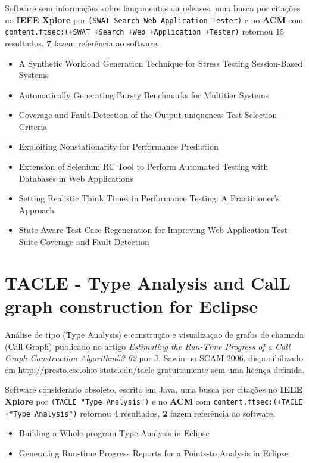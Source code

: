 Software sem informações sobre lançamentos ou releases,
uma busca por citações no {\bf IEEE Xplore} por
\texttt{(SWAT Search Web Application Tester)}
e no {\bf ACM} com
\texttt{content.ftsec:(+SWAT +Search +Web +Application +Tester)}
retornou
15 resultados,
{\bf 7} fazem referência ao software.

\begin{itemize}
\item A Synthetic Workload Generation Technique for Stress Testing Session-Based Systems
\item Automatically Generating Bursty Benchmarks for Multitier Systems
\item Coverage and Fault Detection of the Output-uniqueness Test Selection Criteria
\item Exploiting Nonstationarity for Performance Prediction
\item Extension of Selenium RC Tool to Perform Automated Testing with Databases in Web Applications
\item Setting Realistic Think Times in Performance Testing: A Practitioner's Approach
\item State Aware Test Case Regeneration for Improving Web Application Test Suite Coverage and Fault Detection
\end{itemize}


\section{TACLE - Type Analysis and CalL graph construction for Eclipse}

Análise de tipo (Type Analysis) e construção e visualizaçao de grafos de chamada (Call Graph)
publicado no artigo {\it Estimating the Run-Time Progress of a Call Graph Construction Algorithm53-62}
por J. Sawin
no SCAM 2006,
disponibilizado em \url{http://presto.cse.ohio-state.edu/tacle}
gratuitamente
sem uma licença definida.

Software considerado obsoleto,
escrito em Java,
uma busca por citações no {\bf IEEE Xplore} por
\texttt{(TACLE "Type Analysis")}
e no {\bf ACM} com
\texttt{content.ftsec:(+TACLE +"Type Analysis")}
retornou
4 resultados,
{\bf 2} fazem referência ao software.

\begin{itemize}
\item Building a Whole-program Type Analysis in Eclipse
\item Generating Run-time Progress Reports for a Points-to Analysis in Eclipse
\end{itemize}


